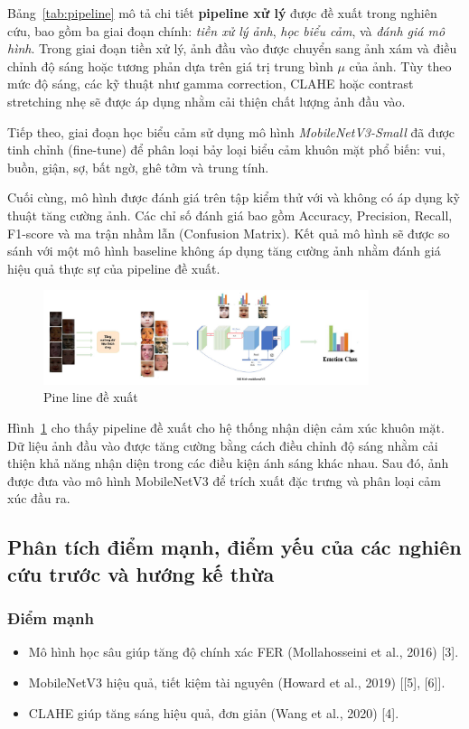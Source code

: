 Bảng~\ref{tab:pipeline} mô tả chi tiết \textbf{pipeline xử lý} được đề xuất trong nghiên cứu, bao gồm ba giai đoạn chính: \textit{tiền xử lý ảnh}, \textit{học biểu cảm}, và \textit{đánh giá mô hình}. Trong giai đoạn tiền xử lý, ảnh đầu vào được chuyển sang ảnh xám và điều chỉnh độ sáng hoặc tương phản dựa trên giá trị trung bình $\mu$ của ảnh. Tùy theo mức độ sáng, các kỹ thuật như gamma correction, CLAHE hoặc contrast stretching nhẹ sẽ được áp dụng nhằm cải thiện chất lượng ảnh đầu vào.

Tiếp theo, giai đoạn học biểu cảm sử dụng mô hình \textit{MobileNetV3-Small} đã được tinh chỉnh (fine-tune) để phân loại bảy loại biểu cảm khuôn mặt phổ biến: vui, buồn, giận, sợ, bất ngờ, ghê tởm và trung tính.

Cuối cùng, mô hình được đánh giá trên tập kiểm thử với và không có áp dụng kỹ thuật tăng cường ảnh. Các chỉ số đánh giá bao gồm Accuracy, Precision, Recall, F1-score và ma trận nhầm lẫn (Confusion Matrix). Kết quả mô hình sẽ được so sánh với một mô hình baseline không áp dụng tăng cường ảnh nhằm đánh giá hiệu quả thực sự của pipeline đề xuất.


\begin{figure}[H]
    \centering
    \includegraphics[width=0.85\textwidth]{img/pineline.jpg} %
    \caption{Pine line đề xuất}
    \label{fig:pineline}
\end{figure}

Hình~\ref{fig:pineline} cho thấy pipeline đề xuất cho hệ thống nhận diện cảm xúc khuôn mặt. Dữ liệu ảnh đầu vào được tăng cường bằng cách điều chỉnh độ sáng nhằm cải thiện khả năng nhận diện trong các điều kiện ánh sáng khác nhau. Sau đó, ảnh được đưa vào mô hình MobileNetV3 để trích xuất đặc trưng và phân loại cảm xúc đầu ra.

\subsection{Phân tích điểm mạnh, điểm yếu của các nghiên cứu trước và hướng kế thừa}

\subsubsection{Điểm mạnh}
\begin{itemize}
    \item Mô hình học sâu giúp tăng độ chính xác FER (Mollahosseini et al., 2016) [3].
    \item MobileNetV3 hiệu quả, tiết kiệm tài nguyên (Howard et al., 2019) [[5], [6]].
    \item CLAHE giúp tăng sáng hiệu quả, đơn giản (Wang et al., 2020) [4].
\end{itemize}

